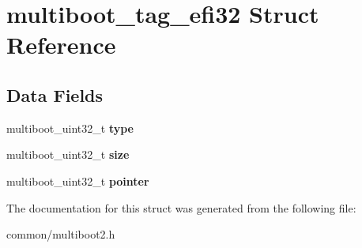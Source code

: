 \hypertarget{structmultiboot__tag__efi32}{}\section{multiboot\+\_\+tag\+\_\+efi32 Struct Reference}
\label{structmultiboot__tag__efi32}
\subsection*{Data Fields}
\begin{DoxyCompactItemize}
\item 
multiboot\+\_\+uint32\+\_\+t {\bfseries type}\hypertarget{structmultiboot__tag__efi32_a9ea264af08a600251a43cc76b0702c86}{}\label{structmultiboot__tag__efi32_a9ea264af08a600251a43cc76b0702c86}

\item 
multiboot\+\_\+uint32\+\_\+t {\bfseries size}\hypertarget{structmultiboot__tag__efi32_a2b0b759f28046e60720b025e2442c11e}{}\label{structmultiboot__tag__efi32_a2b0b759f28046e60720b025e2442c11e}

\item 
multiboot\+\_\+uint32\+\_\+t {\bfseries pointer}\hypertarget{structmultiboot__tag__efi32_a4b1ffdc97a86618a45839931345edca4}{}\label{structmultiboot__tag__efi32_a4b1ffdc97a86618a45839931345edca4}

\end{DoxyCompactItemize}


The documentation for this struct was generated from the following file\+:\begin{DoxyCompactItemize}
\item 
common/multiboot2.\+h\end{DoxyCompactItemize}
